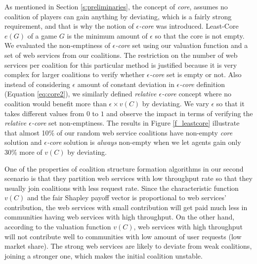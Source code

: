 \documentclass[10pt,journal,cspaper,compsoc]{IEEEtran}
\begin{document}
As mentioned in Section \ref{s:preliminaries}, the concept of
\emph{core}, assumes no coalition of players can gain anything by
deviating, which is a fairly strong requirement, and that is why
the notion of \emph{$\epsilon$-core} was introduced. Least-Core
$e(G)$ of a game $G$ is the minimum amount of $\epsilon$ so that
the core is not empty. We evaluated the non-emptiness of
\emph{$\epsilon$-core} set using our valuation function and a set
of web services from our coalitions.  The restriction on the
number of web services per coalition for this particular method is
justified because it is
very complex for larger coalitions to verify whether
\emph{$\epsilon$-core} set is empty or not. Also instead of
considering $\epsilon$ amount of constant deviation in
\emph{$\epsilon$-core} definition (Equation \ref{eq:core2}), we
similarly defined \emph{relative $\epsilon$-core} concept where no
coalition would benefit more than \emph{$\epsilon \times v(C)$} by
deviating. We vary $\epsilon$ so that it takes different values
from $0$ to $1$ and observe the impact in terms of verifying the
\emph{relative $\epsilon$-core} set non-emptiness. The results in
Figure \ref{f_leastcore} illustrate that almost 10\% of our random
web service coalitions have non-empty \emph{core} solution and
\emph{$\epsilon$-core} solution is \emph{always} non-empty when we
let agents gain only 30\% more of $v(C)$ by deviating.

One of the properties of coalition structure formation algorithms
in our second scenario is that they partition web services with
low throughput rate so that they usually join coalitions with less
request rate. Since the characteristic function $v(C)$ and the
fair Shapley payoff vector is proportional to web services'
contribution, the web services with small contribution will get
paid much less in communities having web services with high
throughput. On the other hand, according to the valuation function
$v(C)$, web services with high throughput will not contribute well
to communities with low amount of user requests (low market
share). The strong web services are likely to deviate from weak
coalitions, joining a stronger one, which makes the initial
coalition unstable.
\end{document}
